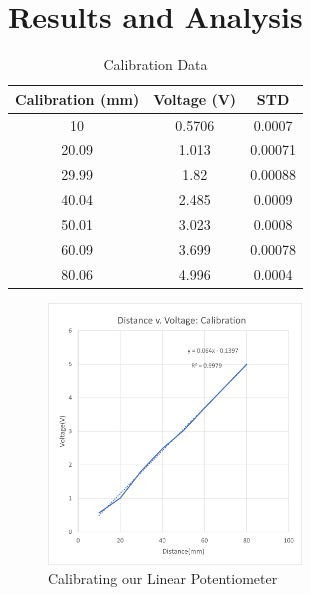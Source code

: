 \documentclass{article}
\begin{document}
\section{Results and Analysis}

\begin{table}[ht]
  \centering
  \begin{tabular}{ccc}
  \hline
  Calibration (mm) & Voltage (V) & STD \\
  \hline
  10 & 0.5706 & 0.0007 \\
  20.09 & 1.013 & 0.00071 \\
  29.99 & 1.82 & 0.00088 \\
  40.04 & 2.485 & 0.0009 \\
  50.01 & 3.023 & 0.0008 \\
  60.09 & 3.699 & 0.00078 \\
  80.06 & 4.996 & 0.0004 \\
  \hline
  \end{tabular}
  \caption{Calibration Data}
  \label{table:calibration_data}
  \end{table}
  

\begin{figure}[hbtp]
  \centering
  \includegraphics[width=0.6\textwidth]{lab3images/Calibration.png}
  \caption{Calibrating our Linear Potentiometer}
  \label{fig:Calibration}
\end{figure}
\end{document}
